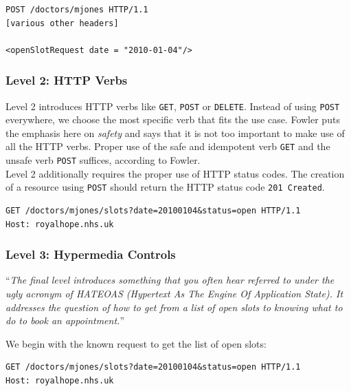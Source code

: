 \lstset{language=XML}
\begin{lstlisting}[caption=Level 1: Referring to the doctor as a resource. \citep{richardsonmaturitymodel}]
POST /doctors/mjones HTTP/1.1
[various other headers]

<openSlotRequest date = "2010-01-04"/>
\end{lstlisting}

\subsubsection{Level 2: HTTP Verbs}
Level 2 introduces HTTP verbs like \lstinline{GET}, \lstinline{POST} or \lstinline{DELETE}. Instead of using \lstinline{POST} everywhere, we choose the most specific verb that fits the use case.
Fowler puts the emphasis here on \textit{safety} and says that it is not too important to make use of all the HTTP verbs. Proper use of the safe and idempotent verb \lstinline{GET} and the unsafe verb \lstinline{POST} suffices, according to Fowler. \citep{richardsonmaturitymodel} \\
Level 2 additionally requires the proper use of HTTP status codes. The creation of a resource using \lstinline{POST} should return the HTTP status code \lstinline{201 Created}.

\lstset{language=XML}
\begin{lstlisting}[caption=Level 2: Safely fetching the list of open slots using \lstinline{GET}. \citep{richardsonmaturitymodel}]
GET /doctors/mjones/slots?date=20100104&status=open HTTP/1.1
Host: royalhope.nhs.uk
\end{lstlisting}

\subsubsection{Level 3: Hypermedia Controls}
``\textit{The final level introduces something that you often hear referred to under the ugly acronym of HATEOAS (Hypertext As The Engine Of Application State). It addresses the question of how to get from a list of open slots to knowing what to do to book an appointment.}'' \citep{richardsonmaturitymodel}

We begin with the known request to get the list of open slots:

\lstset{language=XML}
\begin{lstlisting}[caption=Fetching the list of open slots. \citep{richardsonmaturitymodel}]
GET /doctors/mjones/slots?date=20100104&status=open HTTP/1.1
Host: royalhope.nhs.uk
\end{lstlisting}

